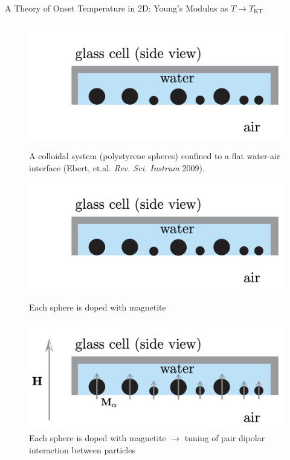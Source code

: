 \begin{frame}{A Theory of Onset Temperature in 2D: Young's Modulus as $T \to T_\mathrm{KT}$}
\begin{columns}
\begin{column}[T]{0.425\textwidth}
\begin{figure}
\begin{overprint}
\vspace{15pt}\centering\includegraphics[width=\linewidth]{c.13-kt_keim_1/keim_setup_1.pdf}\caption{A colloidal system (polystyrene spheres) confined to a flat water-air interface (Ebert, et.al. \textit{Rev. Sci. Instrum} 2009).}

\vspace{15pt}\centering\includegraphics[width=\linewidth]{c.13-kt_keim_1/keim_setup_1.pdf}\caption{Each sphere is doped with magnetite}

\vspace{15pt}\centering\includegraphics[width=\linewidth]{c.13-kt_keim_1/keim_setup_2.pdf}\caption{Each sphere is doped with magnetite $\to$ tuning of pair dipolar interaction between particles}


\end{overprint}
\end{figure}
\end{column}
\end{columns}
\end{frame}

